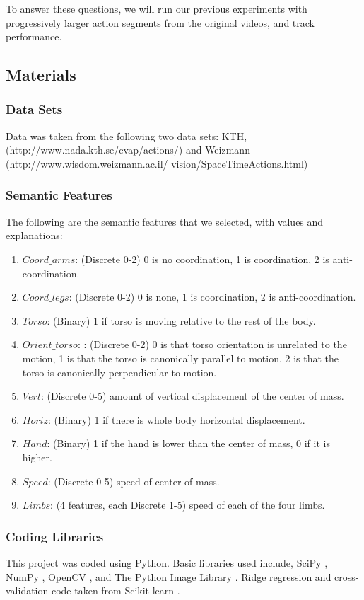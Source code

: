 \documentclass{article}
\begin{document}
To answer these questions, we will run our previous experiments with progressively larger action segments from the original videos, and track performance.
\label{time}
\subsection{Materials}
\subsubsection{Data Sets}
Data was taken from the following two data sets: KTH, (http://www.nada.kth.se/cvap/actions/) and Weizmann (http://www.wisdom.weizmann.ac.il/\texttildelow
vision/SpaceTimeActions.html)
\subsubsection{Semantic Features}
\label{sf}
The following are the semantic features that we selected, with values and explanations:
\begin{enumerate}
\item
$Coord\_arms$: (Discrete 0-2) 0 is no coordination, 1 is coordination, 2 is anti-coordination.
\item
$Coord\_legs$: (Discrete 0-2) 0 is none, 1 is coordination, 2 is anti-coordination.
\item
$Torso$: (Binary) 1 if torso is moving relative to the rest of the body.
\item
$Orient\_torso$: : (Discrete 0-2) 0 is that torso orientation is unrelated to the motion, 1 is that the torso is canonically parallel to motion, 2 is that the torso is canonically perpendicular to motion.
\item
$Vert$: (Discrete 0-5) amount of vertical displacement of the center of mass.
\item
$Horiz$: (Binary) 1 if there is whole body horizontal displacement.
\item
$Hand$: (Binary) 1 if the hand is lower than the center of mass, 0 if it is higher.
\item
$Speed$: (Discrete 0-5) speed of center of mass.
\item
$Limbs$: (4 features, each Discrete 1-5) speed of each of the four limbs.
\end{enumerate}
\subsubsection{Coding Libraries}
This project was coded using Python. Basic libraries used include, SciPy \cite{scipy}, NumPy \cite{numpy}, OpenCV \cite{opencv}, and The Python Image Library \cite{pil}. Ridge regression and cross-validation code taken from Scikit-learn \cite{scikit}.
\end{document}
